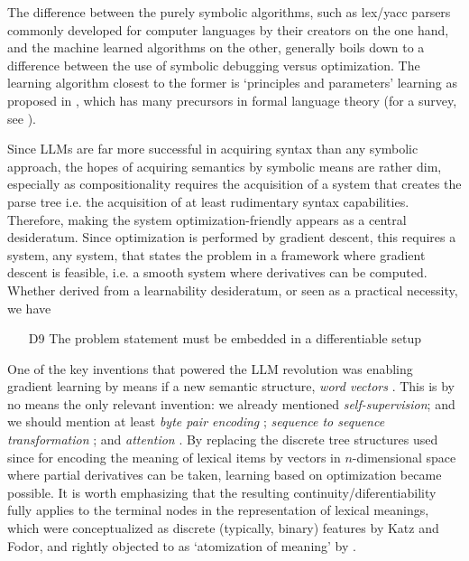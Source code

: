 \documentclass[output=paper,colorlinks=true,citecolor=brown]{langscibook}
\begin{document}
The difference between the purely symbolic algorithms, such as lex/yacc
par\-sers commonly developed for computer languages by their creators on the
one hand, and the machine learned algorithms on the other, generally boils down
to a difference between the use of symbolic debugging versus optimization. The
learning algorithm closest to the former is `principles and parameters'
learning as proposed in \citet{Chomsky:1993}, which has many precursors in
formal language theory (for a survey, see \cite{Angluin:1980}).

Since LLMs are far more successful in acquiring syntax than any symbolic
approach, the hopes of acquiring semantics by symbolic means are rather dim,
especially as compositionality requires the acquisition of a system that
creates the parse tree i.e. the acquisition of at least rudimentary syntax
capabilities. Therefore, making the system optimization-friendly appears as a
central desideratum. Since optimization is performed by gradient descent, this
requires a system, any system, that states the problem in a framework where
gradient descent is feasible, i.e. a smooth system where derivatives can
be computed. Whether derived from a learnability desideratum, or seen as a
practical necessity, we have

\begin{itemize}
\item[D9] The problem statement must be embedded in a differentiable setup
\end{itemize}

One of the key inventions that powered the LLM revolution was enabling
gradient learning by means if a new semantic structure, \emph{word vectors}
\citep{Schutze:1993,Collobert:2011}. This is by no means the only relevant
invention: we already mentioned \emph{self-supervision}; and we should mention
at least \emph{byte pair encoding} \citep{Gage:1994}; \emph{sequence to sequence
  transformation} \citep{Sutskever:2014}; and \emph{attention}
\citep{Vaswani:2017}. By replacing the discrete tree structures used since
\citet{Katz:1963} for encoding the meaning of lexical items by vectors in
$n$-dimensional space where partial derivatives can be taken, learning based
on optimization became possible. It is worth emphasizing that the resulting
continuity/diferentiability fully applies to the terminal nodes in the
representation of lexical meanings, which were conceptualized as discrete
(typically, binary) features by Katz and Fodor, and rightly objected to as
`atomization of meaning' by \citet{Bolinger:1965b}. 
\end{document}
